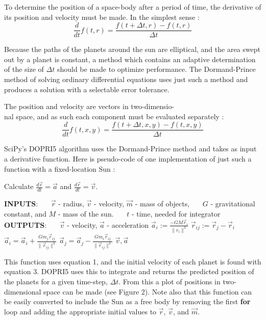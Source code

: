 \documentclass{article}%
\begin{document}
To determine the position of a space-body after a period of time, the derivative of its position and velocity must be made. In the simplest sense :
  $$\frac {d}{dt}f(t,r) = \frac{f(t+\Delta t, r) - f(t,r)}{\Delta t}$$
  
Because the paths of the planets around the sun are elliptical, and the area swept out by a planet is constant, a method which contains an adaptive determination of the size of $\Delta t$ should be made to optimize performance.  The Dormand-Prince method of solving ordinary differential equations uses just such a method and produces a solution with a selectable error tolerance.

The position and velocity are vectors in two-dimensio-\\nal space, and as such each component must be evaluated separately :
$$\frac {d}{dt}f(t,x,y) = \frac{f(t+\Delta t, x,y) - f(t,x,y)}{\Delta t}$$

SciPy's DOPRI5 algorithm uses the Dormand-Prince method and takes as input a derivative function.  Here is pseudo-code of one implementation of just such a function with a fixed-location Sun :

\begin{algorithm}[h!]
  \caption{Calculate $\frac {d\vec v}{dt} = \vec a$ and 
                     $\frac {d\vec r}{dt} = \vec v$.}
  \begin{algorithmic} 
  \STATE \textbf{INPUTS}: 
  \STATE \ \ \ $\vec r$ - radius, $\vec v$ - velocity, $\vec m$ - mass of objects,
  \STATE \ \ \ $G$ - gravitational constant, and $M$ - mass of the sun.
  \STATE \ \ \ $t$ - time, needed for integrator
  \STATE \textbf{OUTPUTS}: 
  \STATE \ \ \ $\vec v$ - velocity, $\vec a$ - acceleration
      \STATE $\vec a_i := \frac{-GM\vec r_i}{\|r_i\|^3}$
    \ENDFOR
        \STATE $\vec r_{ij} := \vec r_{j} - \vec r_{i}$
        \STATE $\vec a_i = 
               \vec a_i + \frac{Gm_j\vec r_{ij}}{\|\vec r_{ij}\|^3}$
        \STATE $\vec a_j = 
               \vec a_j - \frac{Gm_i\vec r_{ij}}{\|\vec r_{ij}\|^3}$
      \ENDFOR
    \ENDFOR
    \RETURN $\vec v, \vec a$
  \end{algorithmic}
\end{algorithm}

This function uses equation 1, and the initial velocity of each planet is found with equation 3.  DOPRI5 uses this to integrate and returns the predicted position of the planets for a given time-step, $\Delta t$.  From this a plot of positions in two-dimensional space can be made (see Figure 2).  Note also that this function can be easily converted to include the Sun as a free body by removing the first \textbf{for} loop and adding the appropriate initial values to $\vec r$, $\vec v$, and $\vec m$.
\end{document}
